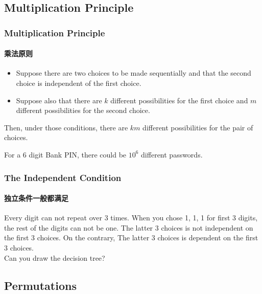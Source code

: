 \documentclass[
	11pt, %
	handout,
]{beamer}
\begin{document}

\subsection{Multiplication Principle}


\begin{frame}
	\frametitle{Multiplication Principle} %
	\framesubtitle{乘法原则}
	\begin{definition}
		\begin{itemize}
			\item Suppose there are two choices to be made sequentially and that the second choice is independent of the first choice.
			\item Suppose also that there are $k$ different possibilities for the first choice and $m$ different possibilities for the second choice. 
		\end{itemize}
				Then, \alert{under those conditions}, there are $km$ different possibilities for the pair of choices.
	\end{definition}
	\begin{example}
	For a 6 digit Bank PIN, there could be $10^6$ different passwords. 
	\end{example}
\end{frame}


\begin{frame}
	\frametitle{The Independent Condition} %
	\framesubtitle{独立条件一般都满足}
	Every digit can not repeat over 3 times. When you chose 1, 1, 1 for first 3 digits, the rest of the digits can not be one. The latter 3 choices is not independent on the first 3 choices. On the contrary, The latter 3 choices is dependent on the first 3 choices.\\

	\bigskip \bigskip
	\pause Can you draw the decision tree?
\end{frame}


\subsection{Permutations}
\end{document}

